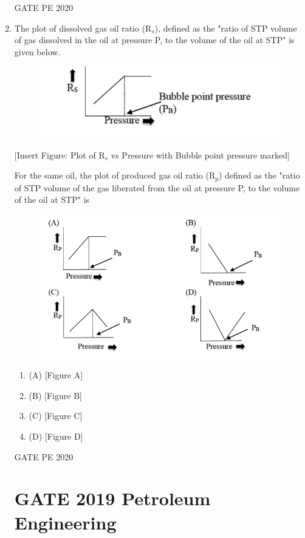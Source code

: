 \documentclass[journal,12pt,onecolumn]{IEEEtran}
\theoremstyle{remark}
\begin{document}
\begin{enumerate}
  \hfill{GATE PE 2020}
   
\item The plot of dissolved gas oil ratio (R$_s$), defined as the "ratio of STP volume of gas dissolved in the oil at pressure P, to the volume of the oil at STP" is given below.
\begin{figure}[h]
    \centering
    \includegraphics[width=0.5\linewidth]{figs/1.jpeg}
    \caption{}
    \label{fig:placeholder}
\end{figure}

\begin{center}
[Insert Figure: Plot of R$_s$ vs Pressure with Bubble point pressure marked]
\end{center}

For the same oil, the plot of produced gas oil ratio (R$_p$) defined as the "ratio of STP volume of the gas liberated from the oil at pressure P, to the volume of the oil at STP" is
\begin{figure}[h]
    \centering
    \includegraphics[width=0.5\linewidth]{figs/2.jpeg}
    \caption{}
    \label{fig:placeholder}
\end{figure}

\begin{multicols}{2}
\begin{enumerate}
\item (A) [Figure A]
\item (B) [Figure B]
\item (C) [Figure C]
\item (D) [Figure D]
\end{enumerate}
\end{multicols}


  \hfill{GATE PE 2020}
  

\section*{GATE 2019 Petroleum Engineering}





\end{enumerate}
\end{document}
